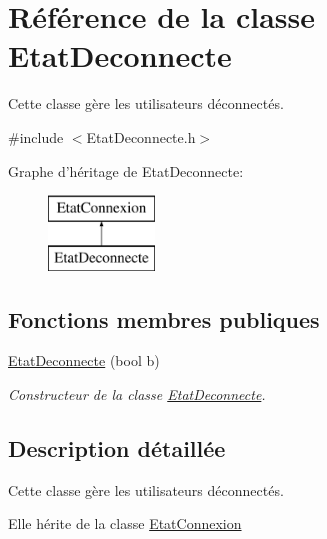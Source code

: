 \hypertarget{class_etat_deconnecte}{\section{Référence de la classe Etat\-Deconnecte}
\label{class_etat_deconnecte}
}


Cette classe gère les utilisateurs déconnectés.  




{\ttfamily \#include $<$Etat\-Deconnecte.\-h$>$}

Graphe d'héritage de Etat\-Deconnecte\-:\begin{figure}[H]
\begin{center}
\leavevmode
\includegraphics[height=2.000000cm]{class_etat_deconnecte}
\end{center}
\end{figure}
\subsection*{Fonctions membres publiques}
\begin{DoxyCompactItemize}
\item 
\hyperlink{class_etat_deconnecte_add0d9bf610ab5ca451880beacd6f0490}{Etat\-Deconnecte} (bool b)
\begin{DoxyCompactList}\small\item\em Constructeur de la classe \hyperlink{class_etat_deconnecte}{Etat\-Deconnecte}. \end{DoxyCompactList}\end{DoxyCompactItemize}


\subsection{Description détaillée}
Cette classe gère les utilisateurs déconnectés. 

Elle hérite de la classe \hyperlink{class_etat_connexion}{Etat\-Connexion} 

